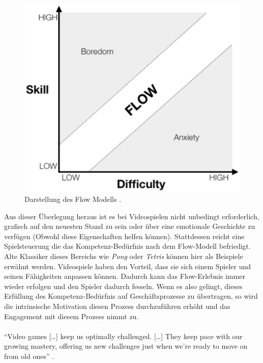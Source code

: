 \documentclass[a4paper,12pt]{scrartcl}
\begin{document}
\begin{figure}[h!]
\begin{center}
\includegraphics[scale = 0.6]{Bilder/FlowModel.eps}
\caption{Darstellung des Flow Modells \cite{FlowModel}.}
\label{FlowModelBild}
\end{center}
\end{figure}
Aus dieser Überlegung heraus ist es bei Videospielen nicht unbedingt erforderlich, grafisch auf den neuesten Stand zu sein oder über eine emotionale Geschichte zu verfügen (Obwohl diese Eigenschaften helfen können). Stattdessen reicht eine Spielsteuerung die das Kompetenz-Bedürfnis nach dem Flow-Modell befriedigt. Alte Klassiker dieses Bereichs wie \textit{Pong} oder \textit{Tetris} können hier als Beispiele erwähnt werden. Videospiele haben den Vorteil, dass sie sich einem Spieler und seinen Fähigkeiten anpassen können. Dadurch kann das Flow-Erlebnis immer wieder erfolgen und den Spieler dadurch fesseln. Wenn es also gelingt, dieses Erfüllung des Kompetenz-Bedürfnis auf Geschäftsprozesse zu übertragen, so wird die intrinsische Motivation diesen Prozess durchzuführen erhöht und das Engagement mit diesem Prozess nimmt zu.
\\\\ 
\enquote{Video games […] keep us optimally challenged. […] They keep pace with our growing mastery, offering us new challenges just when we’re ready to move on from old ones} \cite{Rigby2011}.
\\\\
\end{document}
